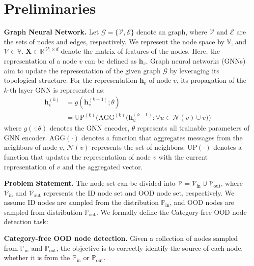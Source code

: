 \section{Preliminaries}
\label{Sec-Preliminaries}
\textbf{Graph Neural Network.} Let $\mathcal{G}=\{\mathcal{V}, \mathcal{E}\}$ denote an graph, where $\mathcal{V}$ and $\mathcal{E}$ are the sets of nodes and edges, respectively. We represent the node space by $\mathbb{V}$, and $\mathcal{V} \in \mathbb{V}$. ${\boldsymbol X} \in \mathbb {R}^{|\mathcal{V}|\times d}$ denote the matrix of features of the nodes. Here, the representation of a node $v$ can be defined as $\mathbf{h}_v$. Graph neural networks (GNNs) aim to update the representation of the given graph $\mathcal{G}$ by leveraging its topological structure. For the representation $\mathbf{h}_v$ of node $v$, its propagation of the $k$-th layer GNN is represented as:
\begin{equation}\label{equa-gnns}
\begin{array}{cl}
   \mathbf{h}_v^{(k)}&=g(\mathbf{h}_v^{(k-1)};\theta)    \\
 &=\mathrm{UP}^{(k)}\big(\mathrm{AGG}^{(k)}\big( \mathbf{h}_u^{(k-1)}:\forall u \in \mathcal{N}(v)\cup v \big) \big) 
\end{array} 
\end{equation}
where $g(\cdot;\theta)$ denotes the GNN encoder, $\theta$ represents all trainable parameters of GNN encoder. $\mathrm{AGG}(\cdot)$ denotes a function that aggregates messages from the neighbors of node $v$, $\mathcal{N}(v)$ represents the set of neighbors. $\mathrm{UP}(\cdot)$ denotes a function that updates the representation of node $v$ with the current representation of $v$ and the aggregated vector.

\textbf{Problem Statement.} The node set can be divided into
$\mathcal{V} = \mathcal{V}_{\mathrm{in}} \cup \mathcal{V}_{\mathrm{out}}$, where $\mathcal{V}_{\mathrm{in}}$ and $\mathcal{V}_{\mathrm{out}}$ represents the ID node set and OOD node set, respectively. We assume ID nodes are sampled from the distribution $\mathbb{P}_{\mathrm{in}}$, and OOD nodes are sampled from distribution $\mathbb{P}_{\mathrm{out}}$. We formally define the Category-free OOD node detection task:
\begin{definition} \textbf{Category-free OOD node detection.} Given a collection of nodes sampled from $\mathbb{P}_{\mathrm{in}}$ and $\mathbb{P}_{\mathrm{out}}$, the objective is to correctly identify the source of each node, whether it is from the  $\mathbb{P}_{\mathrm{in}}$ or $\mathbb{P}_{\mathrm{out}}$.
\end{definition}

